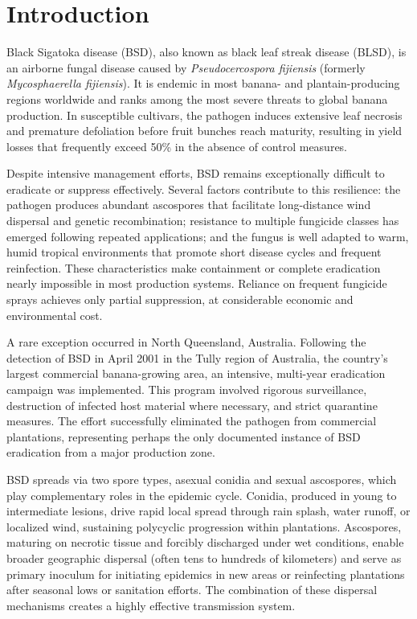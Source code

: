\documentclass[11pt]{article}
\numberwithin{equation}{section}
\begin{document}
\section{Introduction}\label{sec:intro}
Black Sigatoka disease (BSD), also known as black leaf streak disease (BLSD), is an airborne fungal disease caused by \textit{Pseudocercospora fijiensis} (formerly \textit{Mycosphaerella fijiensis}). It is endemic in most banana- and plantain-producing regions worldwide and ranks among the most severe threats to global banana production. In susceptible cultivars, the pathogen induces extensive leaf necrosis and premature defoliation before fruit bunches reach maturity, resulting in yield losses that frequently exceed 50\% in the absence of control measures.

Despite intensive management efforts, BSD remains exceptionally difficult to eradicate or suppress effectively. Several factors contribute to this resilience: the pathogen produces abundant ascospores that facilitate long-distance wind dispersal and genetic recombination; resistance to multiple fungicide classes has emerged following repeated applications; and the fungus is well adapted to warm, humid tropical environments that promote short disease cycles and frequent reinfection. These characteristics make containment or complete eradication nearly impossible in most production systems. Reliance on frequent fungicide sprays achieves only partial suppression, at considerable economic and environmental cost.

A rare exception occurred in North Queensland, Australia. Following the detection of BSD in April 2001 in the Tully region of Australia, the country's largest commercial banana-growing area, an intensive, multi-year eradication campaign was implemented. This program involved rigorous surveillance, destruction of infected host material where necessary, and strict quarantine measures. The effort successfully eliminated the pathogen from commercial plantations, representing perhaps the only documented instance of BSD eradication from a major production zone.

BSD spreads via two spore types, asexual conidia and sexual ascospores, which play complementary roles in the epidemic cycle. Conidia, produced in young to intermediate lesions, drive rapid local spread through rain splash, water runoff, or localized wind, sustaining polycyclic progression within plantations. Ascospores, maturing on necrotic tissue and forcibly discharged under wet conditions, enable broader geographic dispersal (often tens to hundreds of kilometers) and serve as primary inoculum for initiating epidemics in new areas or reinfecting plantations after seasonal lows or sanitation efforts. The combination of these dispersal mechanisms creates a highly effective transmission system.
\end{document}
